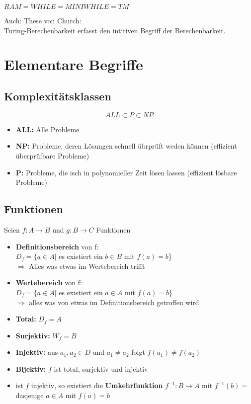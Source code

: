 \documentclass[14pt]{article}
\begin{document}
\begin{definition}
    $RAM = WHILE = MINIWHILE = TM$
\end{definition}

\begin{definition}
    Auch: These von Church: \\
    Turing-Berechenbarkeit erfasst den intitiven Begriff der
    Berechenbarkeit.
\end{definition}
\section{Elementare Begriffe}

\subsection{Komplexitätsklassen}
\[
    ALL \subset P \subset NP
\]
\begin{itemize}
    \item \textbf{ALL:} Alle Probleme
    \item \textbf{NP:} Probleme, deren Lösungen schnell übrprüft weden können
          (effizient überprüfbare Probleme)
    \item \textbf{P:} Probleme, die isch in polynomieller Zeit lösen lassen
          (effizient lösbare Probleme)
\end{itemize}

\subsection{Funktionen}
\begin{definition}[Funktionen]
    Seien $f: A \rightarrow B$ und $g : B \rightarrow C$ Funktionen
    \begin{itemize}
        \item \textbf{Definitionsbereich} von f: \\
              $D_f = \{a \in A |$ es existiert ein $ b \in B$ mit $f(a) = b$\} \\
              $\Rightarrow$ Alles was etwas im Wertebereich trifft
        \item \textbf{Wertebereich} von f: \\
              $D_f = \{a \in A |$ es existiert ein $ a \in A$ mit $f(a) = b$\} \\
              $\Rightarrow$ alles was von etwas im Definitionsbereich
              getroffen wird
        \item \textbf{Total:} $D_f = A$
        \item \textbf{Surjektiv:} $W_f = B$
        \item \textbf{Injektiv:} aus $a_1, a_2 \in D$ und $a_1 \neq a_2$
              folgt $f(a_1) \neq f(a_2)$
        \item \textbf{Bijektiv:} $f$ ist total, surjektiv und injektiv
        \item ist $f$ injektiv, so existiert die \textbf{Umkehrfunktion}
              $f^{-1}: B \rightarrow A$ mit $f^{-1}(b) = $ dasjenige $a  \in A$
              mit $f(a) = b$
    \end{itemize}
\end{definition}
\end{document}
